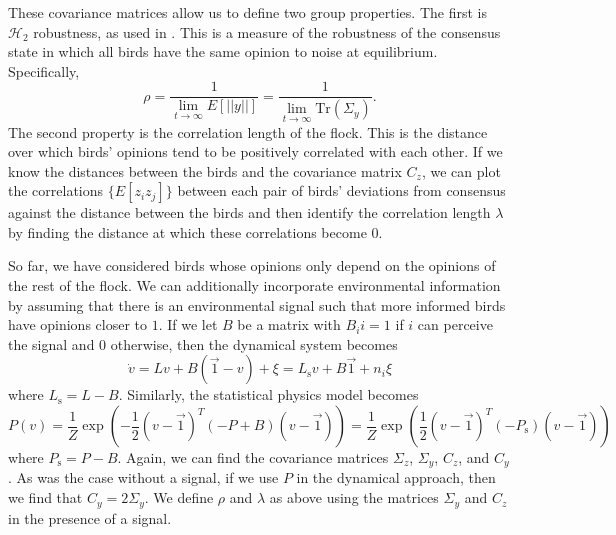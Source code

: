 \documentclass{article}
\newcommand{\Tr}{\text{Tr}}
\begin{document}
These covariance matrices allow us to define two group properties. The first is $\mathscr{H}_2$ robustness, as used in \cite{Young:2010fk,Young:2013kx}. This is a measure of the robustness of the consensus state in which all birds have the same opinion to noise at equilibrium. Specifically, 
\begin{equation}
\rho=\frac{1}{\lim_{t\to\infty}E[||y||]}=\frac{1}{\lim_{t\to\infty}\Tr(\Sigma_y)}. \label{H2def}
\end{equation}
The second property is the correlation length of the flock. This is the distance over which birds' opinions tend to be positively correlated with each other. If we know the distances between the birds and the covariance matrix $C_z$, we can plot the correlations $\{E[z_iz_j]\}$ between each pair of birds' deviations from consensus against the distance between the birds and then identify the correlation length $\lambda$ by finding the distance at which these correlations become $0$.

So far, we have considered birds whose opinions only depend on the opinions of the rest of the flock. We can additionally incorporate environmental information by assuming that there is an environmental signal such that more informed birds have opinions closer to $1$. If we let $B$ be a matrix with $B_ii=1$ if $i$ can perceive the signal and $0$ otherwise, then the dynamical system becomes
\begin{equation}
\dot{v}=Lv+B(\vec{1}-v)+\xi =L_\text{s}v+B\vec{1}+n_i\xi \label{opinion_dynamics2}
\end{equation}
where $L_\text{s}=L-B$. Similarly, the statistical physics model becomes
\begin{equation}
P(v)=\frac{1}{Z}\exp\left(-\frac{1}{2}(v-\vec{1})^T(-P+B)(v-\vec{1})\right)=\frac{1}{Z}\exp\left(\frac{1}{2}(v-\vec{1})^T(-P_\text{s})(v-\vec{1})\right)
\end{equation}
where $P_\text{s}=P-B$. Again, we can find the covariance matrices $\Sigma_z$, $\Sigma_y$, $C_z$, and $C_y$. As was the case without a signal, if we use $P$ in the dynamical approach, then we find that $C_y=2\Sigma_y$. We define $\rho$ and $\lambda$ as above using the matrices $\Sigma_y$ and $C_z$ in the presence of a signal.
\end{document}
